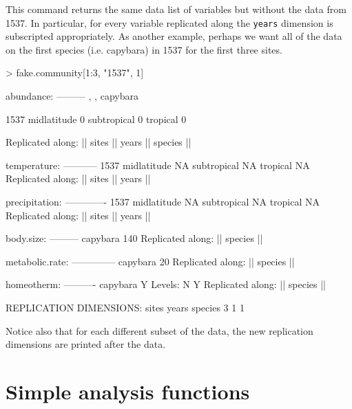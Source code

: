 \documentclass{article}
\newcommand{\code}[1]{\texttt{#1}}
\numberwithin{exercise}{section}
\begin{document}
\noindent This command returns the same data list of variables but without the data from 1537.  In particular, for every variable replicated along the \code{years} dimension is subscripted appropriately.  As another example, perhaps we want all of the data on the first species (i.e. capybara) in 1537 for the first three sites.
\begin{Schunk}
\begin{Sinput}
> fake.community[1:3, "1537", 1]
\end{Sinput}
\begin{Soutput}
abundance:
---------
, , capybara

            1537
midlatitude    0
subtropical    0
tropical       0

Replicated along:  || sites || years || species || 


temperature:
-----------
            1537
midlatitude   NA
subtropical   NA
tropical      NA
Replicated along:  || sites || years || 


precipitation:
-------------
            1537
midlatitude   NA
subtropical   NA
tropical      NA
Replicated along:  || sites || years || 


body.size:
---------
capybara 
     140 
Replicated along:  || species || 


metabolic.rate:
--------------
capybara 
      20 
Replicated along:  || species || 


homeotherm:
----------
capybara 
       Y 
Levels: N Y
Replicated along:  || species || 


REPLICATION DIMENSIONS: 
  sites   years species 
      3       1       1 
\end{Soutput}
\end{Schunk}
\noindent Notice also that for each different subset of the data, the new replication dimensions are printed after the data.

\section{Simple analysis functions}
\end{document}
